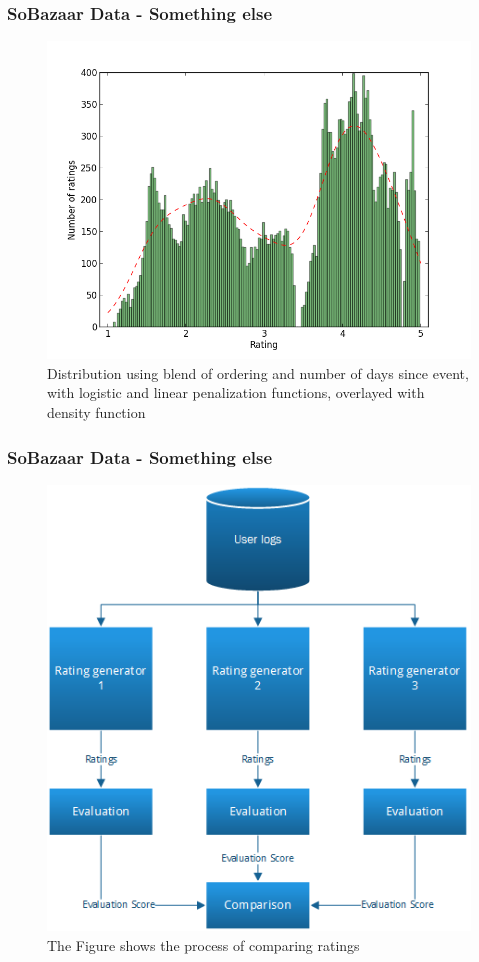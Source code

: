 \documentclass{beamer}
\begin{document}
  \begin{frame}
    \frametitle{SoBazaar Data - Something else}
    \begin{figure}[H]
        \includegraphics[width=5in]{../src/image/dist-blend}
        \centering
    \caption{Distribution using blend of ordering and number of days since event,
  with logistic and linear penalization functions, overlayed with density
  function}
    \end{figure}
  \end{frame}

  \begin{frame}
    \frametitle{SoBazaar Data - Something else}
    \begin{figure}[H]
        \includegraphics[width=5in]{../src/image/ratinggeneval.png}
        \centering
        \caption[Comparing Ratings]{The Figure shows the process of comparing ratings}
    \label{figure:eventIDDistribution}
    \end{figure}
  \end{frame}
\end{document}
